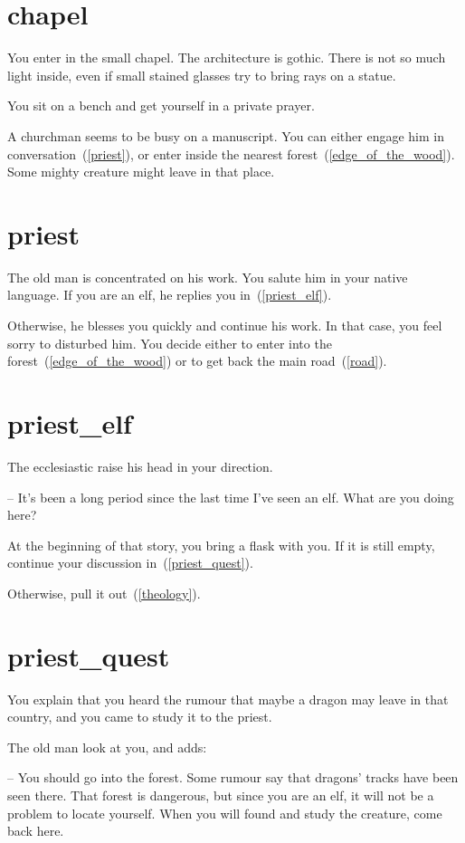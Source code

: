 \section{chapel}

You enter in the small chapel. The architecture is gothic. There is not so much
light inside, even if small stained glasses try to bring rays on a statue.

You sit on a bench and get yourself in a private prayer.

A churchman seems to be busy on a manuscript. You can either engage him in
conversation~(\ref{priest}), or enter inside the nearest
forest~(\ref{edge_of_the_wood}). Some mighty creature might leave in that place.

\section{priest}

The old man is concentrated on his work. You salute him in your native language.
If you are an elf, he replies you in~(\ref{priest_elf}).

Otherwise, he blesses you quickly and continue his work. In that case, you feel
sorry to disturbed him. You decide either to enter into the
forest~(\ref{edge_of_the_wood}) or to get back the main road~(\ref{road}).

\section{priest_elf}

The ecclesiastic raise his head in your direction.

-- It's been a long period since the last time I've seen an elf. What are you
doing here?

At the beginning of that story, you bring a flask with you. If it is still
empty, continue your discussion in~(\ref{priest_quest}).

Otherwise, pull it
out~(\ref{theology}).

\section{priest_quest}

You explain that you heard the rumour that maybe a dragon may leave in that
country, and you came to study it to the priest.

The old man look at you, and adds:

-- You should go into the forest. Some rumour say that dragons' tracks have been
seen there. That forest is dangerous, but since you are an elf, it will not be a
problem to locate yourself. When you will found and study the creature, come
back here.

